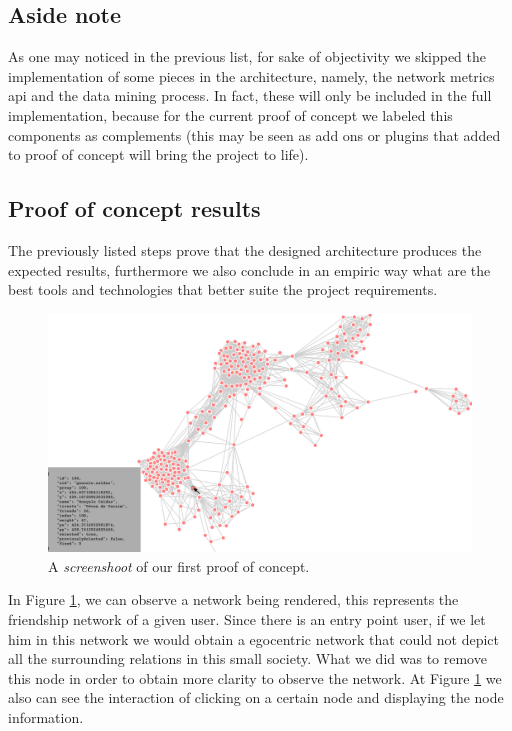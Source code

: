 \subsection*{Aside note}
As one may noticed in the previous list, for sake of objectivity we skipped the implementation of some pieces in the architecture,
namely, the network metrics \gls{api} and the data mining process. In fact, these will only be included in the full implementation, because for the current proof
of concept we labeled this components as complements (this may be seen as add ons or plugins that added to proof of concept will bring the
project to life).\\

\subsection{Proof of concept results}
\indent The previously listed steps prove that the designed architecture produces the expected results, furthermore we also conclude in an empiric way what are
the best tools and technologies that better suite the project requirements.\\

\begin{figure}[h!]
\begin{center}
  \hspace*{-0.8in}
  \includegraphics[width=1.2\textwidth]{img/proof-of-concept.png}
\end{center}
\caption{\label{img:poc} A \textit{screenshoot} of our first proof of concept.}
\end{figure}

\indent In Figure \ref{img:poc}, we can observe a network being rendered, this represents the friendship network of a given user. Since there is an entry point user, if we let him in this network we would obtain a egocentric network that could not depict all the surrounding relations in this small society. What we did was
to remove this node in order to obtain more clarity to observe the network. At Figure \ref{img:poc} we also can see the interaction of clicking on a certain node and displaying the node information.


